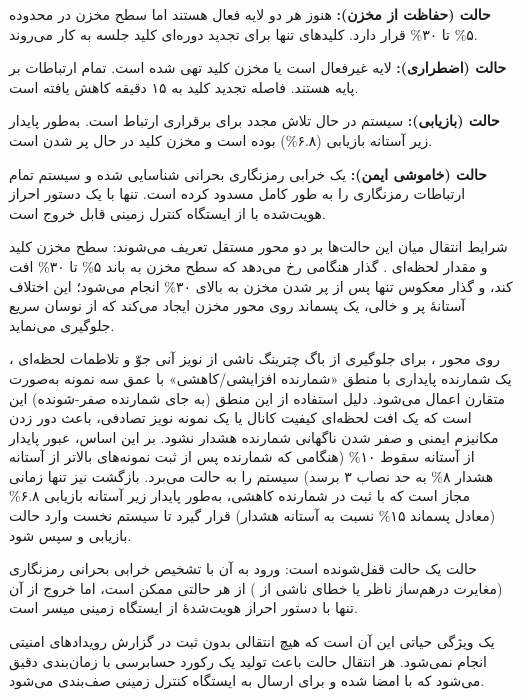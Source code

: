 \documentclass[a4paper,14pt]{extreport}
\begin{document}
\textbf{حالت  (حفاظت از مخزن):} هنوز هر دو لایه فعال هستند اما سطح مخزن  در محدوده ۵\% تا ۳۰\% قرار دارد. کلیدهای  تنها برای تجدید دوره‌ای کلید جلسه به کار می‌روند.

\textbf{حالت  (اضطراری):} لایه  غیرفعال است یا مخزن کلید تهی شده است. تمام ارتباطات بر پایه  هستند. فاصله تجدید کلید به ۱۵ دقیقه کاهش یافته است.

\textbf{حالت  (بازیابی):} سیستم  در حال تلاش مجدد برای برقراری ارتباط است.  به‌طور پایدار زیر آستانه بازیابی (۶.۸\%) بوده است و مخزن کلید در حال پر شدن است.

\textbf{حالت  (خاموشی ایمن):} یک خرابی رمزنگاری بحرانی شناسایی شده و سیستم تمام ارتباطات رمزنگاری را به طور کامل مسدود کرده است. تنها با یک دستور احراز هویت‌شده با  از ایستگاه کنترل زمینی قابل خروج است.

شرایط انتقال میان این حالت‌ها بر دو محور مستقل تعریف می‌شوند: سطح مخزن کلید و مقدار لحظه‌ای . گذار  هنگامی رخ می‌دهد که سطح مخزن به باند ۵\% تا ۳۰\% افت کند، و گذار معکوس  تنها پس از پر شدن مخزن به بالای ۳۰\% انجام می‌شود؛ این اختلاف آستانهٔ پر و خالی، یک پسماند  روی محور مخزن ایجاد می‌کند که از نوسان سریع جلوگیری می‌نماید. 

روی محور ، برای جلوگیری از باگ چترینگ  ناشی از نویز آنی جوّ و تلاطمات لحظه‌ای ، یک شمارنده پایداری  با منطق «شمارنده افزایشی/کاهشی»  با عمق سه نمونه به‌صورت متقارن اعمال می‌شود. دلیل استفاده از این منطق (به جای شمارنده صفر-شونده) این است که یک افت لحظه‌ای کیفیت کانال یا یک نمونه نویز تصادفی، باعث دور زدن مکانیزم ایمنی و صفر شدن ناگهانی شمارنده هشدار نشود. بر این اساس، عبور پایدار از آستانه سقوط ۱۰\% (هنگامی که شمارنده پس از ثبت نمونه‌های بالاتر از آستانه هشدار ۸\% به حد نصاب ۳ برسد) سیستم را به حالت  می‌برد. بازگشت نیز تنها زمانی مجاز است که  با ثبت در شمارنده کاهشی، به‌طور پایدار زیر آستانه بازیابی ۶.۸\% (معادل پسماند ۱۵\% نسبت به آستانه هشدار) قرار گیرد تا سیستم نخست وارد حالت بازیابی  و سپس  شود.

حالت  یک حالت قفل‌شونده  است: ورود به آن با تشخیص خرابی بحرانی رمزنگاری (مغایرت درهم‌ساز ناظر یا خطای  ناشی از ) از هر حالتی ممکن است، اما خروج از آن تنها با دستور احراز هویت‌شدهٔ  از ایستگاه زمینی میسر است.

یک ویژگی حیاتی این  آن است که هیچ انتقالی بدون ثبت در گزارش رویدادهای امنیتی  انجام نمی‌شود. هر انتقال حالت باعث تولید یک رکورد حسابرسی  با زمان‌بندی دقیق می‌شود که با  امضا شده و برای ارسال به ایستگاه کنترل زمینی صف‌بندی می‌شود.
\end{document}
